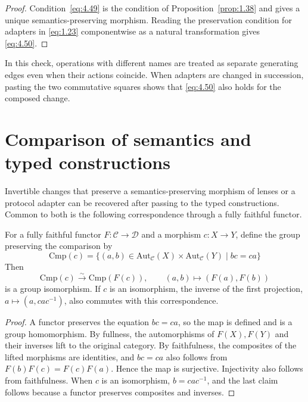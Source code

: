 \begin{proof}

Condition~\eqref{eq:4.49} is the condition of Proposition~\ref{prop:1.38} and gives a
unique semantics-preserving morphism.
Reading the preservation condition for adapters in \eqref{eq:1.23} componentwise as a
natural transformation gives \eqref{eq:4.50}.

\end{proof}

In this check, operations with different names are treated as separate generating edges
even when their actions coincide.
When adapters are changed in succession, pasting the two commutative squares shows that
\eqref{eq:4.50} also holds for the composed change.

\section{Comparison of semantics and typed constructions}\label{sec:4.12}

Invertible changes that preserve a semantics-preserving morphism of lenses or a
protocol adapter can be recovered after passing to the typed constructions.
Common to both is the following correspondence through a fully faithful functor.

\begin{theorem}\label{thm:4.41}

For a fully faithful functor $F:\mathcal{C}\to \mathcal{D}$ and a morphism $c:X\to Y$,
define the group preserving the comparison by
\begin{equation*}
\mathrm{Cmp}(c)=
\{(a,b)\in\mathrm{Aut}_{\mathcal{C}}(X)\times\mathrm{Aut}_{\mathcal{C}}(Y)
\mid bc=ca\}
\tag{4.51}\label{eq:4.51}
\end{equation*}
Then
\begin{equation*}
\mathrm{Cmp}(c)\xrightarrow{\sim}\mathrm{Cmp}(F(c)),
\qquad(a,b)\longmapsto(F(a),F(b))
\tag{4.52}\label{eq:4.52}
\end{equation*}
is a group isomorphism.
If $c$ is an isomorphism, the inverse of the first projection,
$a\mapsto(a,cac^{-1})$, also commutes with this correspondence.

\end{theorem}

\begin{proof}

A functor preserves the equation $bc=ca$, so the map is defined and is a group
homomorphism.
By fullness, the automorphisms of $F(X),F(Y)$ and their inverses lift to the original
category.
By faithfulness, the composites of the lifted morphisms are identities, and
$bc=ca$ also follows from $F(b)F(c)=F(c)F(a)$.
Hence the map is surjective. Injectivity also follows from faithfulness.
When $c$ is an isomorphism, $b=cac^{-1}$, and the last claim follows because a functor
preserves composites and inverses.

\end{proof}

